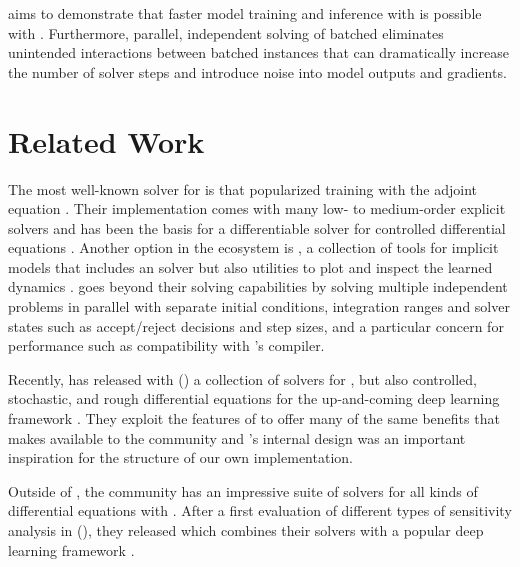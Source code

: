 \documentclass{article}
\begin{document}
\torchode{} aims to demonstrate that faster model training and inference with \ODEs{} is possible with \pytorch{}. Furthermore, parallel, independent solving of batched \ODEs{} eliminates unintended interactions between batched instances that can dramatically increase the number of solver steps and introduce noise into model outputs and gradients.

\section{Related Work}\label{sec:related-work}

The most well-known \ODE{} solver for \pytorch{} is \torchdiffeq{} that popularized training with the adjoint equation \citep{chen2018neural}. Their implementation comes with many low- to medium-order explicit solvers and has been the basis for a differentiable solver for controlled differential equations \citep{kidger2020neural}. Another option in the \pytorch{} ecosystem is \torchdyn{}, a collection of tools for implicit models that includes an \ODE{} solver but also utilities to plot and inspect the learned dynamics \citep{poli2021torchdyn}. \torchode{} goes beyond their \ODE{} solving capabilities by solving multiple independent problems in parallel with separate initial conditions, integration ranges and solver states such as accept/reject decisions and step sizes, and a particular concern for performance such as compatibility with \pytorch{}'s \jit{} compiler.

Recently, \citeauthor{kidger2022neural} has released with \diffrax{} (\citeyear{kidger2022neural}) a collection of solvers for \ODEs{}, but also controlled, stochastic, and rough differential equations for the up-and-coming deep learning framework \jax{} \citep{bradbury2018jax}. They exploit the features of \jax{} to offer many of the same benefits that \torchode{} makes available to the \pytorch{} community and \diffrax{}'s internal design was an important inspiration for the structure of our own implementation.

Outside of \python{}, the \julia{} community has an impressive suite of solvers for all kinds of differential equations with \diffeq{} \citep{rackauckas2017differentialequations}. After a first evaluation of different types of sensitivity analysis in \citeyear{ma2018comparison} (\citeauthor{ma2018comparison}), they released \diffeqflux{} which combines their \ODE{} solvers with a popular deep learning framework \citep{rackauckas2019diffeqflux}.
\end{document}
